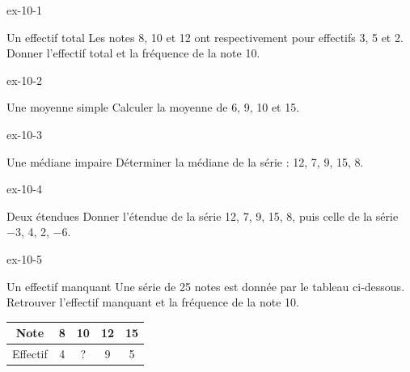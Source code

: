 \clearpage{}
\begin{blocLivre}{ex-10-1}\begin{exercice}[1]{Un effectif total}
Les notes 8, 10 et 12 ont respectivement pour effectifs 3, 5 et 2. Donner l’effectif total et la fréquence de la note 10.
\end{exercice}\end{blocLivre}
\begin{blocLivre}{ex-10-2}\begin{exercice}[1]{Une moyenne simple}
Calculer la moyenne de 6, 9, 10 et 15.
\end{exercice}\end{blocLivre}
\begin{blocLivre}{ex-10-3}\begin{exercice}[1]{Une médiane impaire}
Déterminer la médiane de la série : 12, 7, 9, 15, 8.
\end{exercice}\end{blocLivre}
\begin{blocLivre}{ex-10-4}\begin{exercice}[1]{Deux étendues}
Donner l’étendue de la série 12, 7, 9, 15, 8, puis celle de la série $-3$, 4, 2, $-6$.
\end{exercice}\end{blocLivre}
\begin{blocLivre}{ex-10-5}\begin{exercice}[1]{Un effectif manquant}
Une série de 25 notes est donnée par le tableau ci-dessous. Retrouver l’effectif manquant et la fréquence de la note 10.\begin{center}\renewcommand{\arraystretch}{1.35}\begin{tabular}{c|cccc}\toprule
Note & 8 & 10 & 12 & 15\\\midrule
Effectif & 4 & ? & 9 & 5\\
\bottomrule\end{tabular}\end{center}
\end{exercice}\end{blocLivre}

